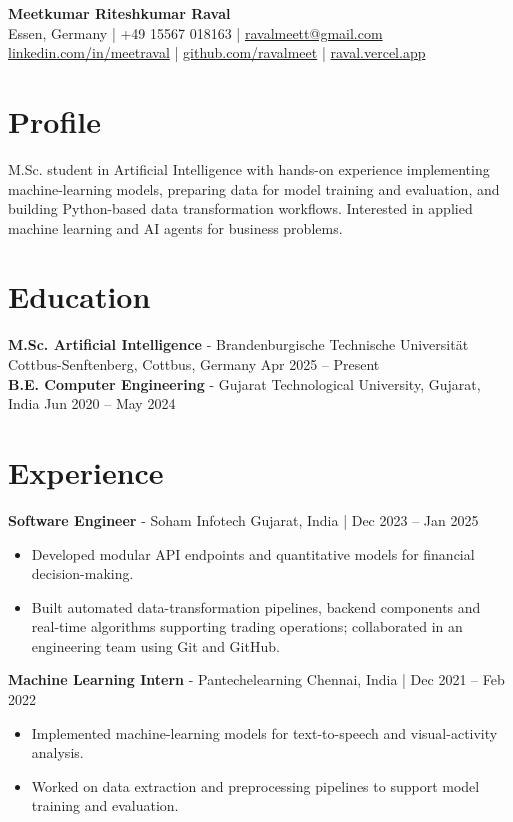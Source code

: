 \documentclass[a4paper,9pt]{article}
\begin{document}
\begin{center}
 {\LARGE\bfseries Meetkumar Riteshkumar Raval}\\[3pt]
 Essen, Germany \;|\; +49 15567 018163 \;|\; \href{mailto:ravalmeett@gmail.com}{ravalmeett@gmail.com}\\[2pt]
 \href{https://www.linkedin.com/in/meetraval/}{linkedin.com/in/meetraval} \;|\;
 \href{https://github.com/ravalmeet}{github.com/ravalmeet} \;|\;
 \href{https://raval.vercel.app/}{raval.vercel.app}
\end{center}
\vspace{-4pt}
\section*{Profile}
M.Sc. student in Artificial Intelligence with hands-on experience implementing machine-learning models, preparing data for model training and evaluation, and building Python-based data transformation workflows. Interested in applied machine learning and AI agents for business problems.
\section*{Education}
\textbf{M.Sc. Artificial Intelligence} - Brandenburgische Technische Universität Cottbus-Senftenberg, Cottbus, Germany \hfill Apr 2025 -- Present\\
\textbf{B.E. Computer Engineering} - Gujarat Technological University, Gujarat, India \hfill Jun 2020 -- May 2024
\section*{Experience}
\textbf{Software Engineer} - Soham Infotech \hfill Gujarat, India \;|\; Dec 2023 -- Jan 2025
\begin{itemize}
 \item Developed modular API endpoints and quantitative models for financial decision-making.
 \item Built automated data-transformation pipelines, backend components and real-time algorithms supporting trading operations; collaborated in an engineering team using Git and GitHub.
\end{itemize}
\textbf{Machine Learning Intern} - Pantechelearning \hfill Chennai, India \;|\; Dec 2021 -- Feb 2022
\begin{itemize}
 \item Implemented machine-learning models for text-to-speech and visual-activity analysis.
 \item Worked on data extraction and preprocessing pipelines to support model training and evaluation.
\end{itemize}
\end{document}
